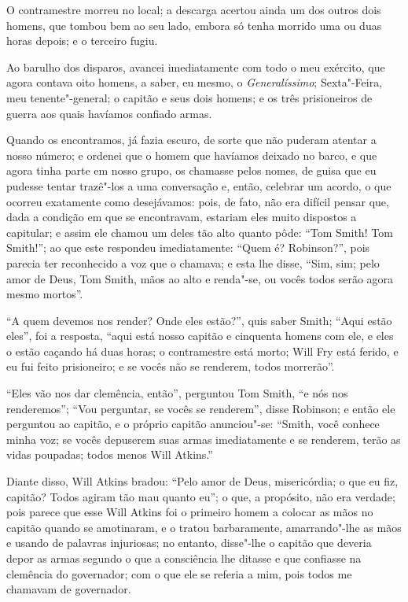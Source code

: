 O contramestre morreu no local; a descarga acertou ainda um dos outros
dois homens, que tombou bem ao seu lado, embora só tenha morrido uma ou
duas horas depois; e o terceiro fugiu.

Ao barulho dos disparos, avancei imediatamente com todo o meu exército,
que agora contava oito homens, a saber, eu mesmo, o
\emph{Generalíssimo}; Sexta"-Feira, meu tenente"-general; o capitão e seus
dois homens; e os três prisioneiros de guerra aos quais havíamos
confiado armas.

Quando os encontramos, já fazia escuro, de sorte que não puderam atentar
a nosso número; e ordenei que o homem que havíamos deixado no barco, e
que agora tinha parte em nosso grupo, os chamasse pelos nomes, de guisa
que eu pudesse tentar trazê"-los a uma conversação e, então, celebrar um
acordo, o que ocorreu exatamente como desejávamos: pois, de fato, não
era difícil pensar que, dada a condição em que se encontravam, estariam
eles muito dispostos a capitular; e assim ele chamou um deles tão alto
quanto pôde: ``Tom Smith! Tom Smith!''; ao que este respondeu
imediatamente: ``Quem é? Robinson?'', pois parecia ter reconhecido a voz
que o chamava; e esta lhe disse, ``Sim, sim; pelo amor de Deus, Tom
Smith, mãos ao alto e renda"-se, ou vocês todos serão agora mesmo
mortos''.

``A quem devemos nos render? Onde eles estão?'', quis saber Smith;
``Aqui estão eles'', foi a resposta, ``aqui está nosso capitão e
cinquenta homens com ele, e eles o estão caçando há duas horas; o
contramestre está morto; Will Fry está ferido, e eu fui feito
prisioneiro; e se vocês não se renderem, todos morrerão''.

``Eles vão nos dar clemência, então'', perguntou Tom Smith, ``e nós nos
renderemos''; ``Vou perguntar, se vocês se renderem'', disse Robinson; e
então ele perguntou ao capitão, e o próprio capitão anunciou"-se:
``Smith, você conhece minha voz; se vocês depuserem suas armas
imediatamente e se renderem, terão as vidas poupadas; todos menos Will
Atkins.''

Diante disso, Will Atkins bradou: ``Pelo amor de Deus, misericórdia; o
que eu fiz, capitão? Todos agiram tão mau quanto eu''; o que, a
propósito, não era verdade; pois parece que esse Will Atkins foi o
primeiro homem a colocar as mãos no capitão quando se amotinaram, e o
tratou barbaramente, amarrando"-lhe as mãos e usando de palavras
injuriosas; no entanto, disse"-lhe o capitão que deveria depor as armas
segundo o que a consciência lhe ditasse e que confiasse na clemência do
governador; com o que ele se referia a mim, pois todos me chamavam de
governador.

